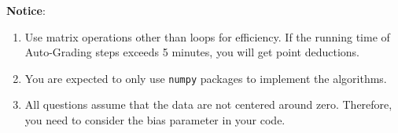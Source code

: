 \documentclass[a4paper, 12pt]{exam}
\begin{document}
	
	\nocite{*}
	\begin{flushleft}
		\textbf{Notice}: \\
		\begin{enumerate}
			\item Use matrix operations other than loops for efficiency. If the running time of Auto-Grading steps exceeds 5 minutes, you will get point deductions.
			\item You are expected to only use \texttt{numpy} packages to implement the algorithms.
			\item All questions assume that the data are not centered around zero. Therefore, you need to consider the bias parameter in your code.
		\end{enumerate}
	\end{flushleft}
	
\end{document}
